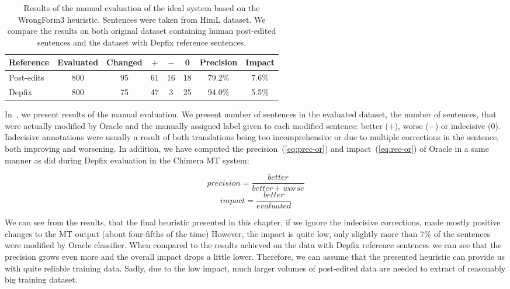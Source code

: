 \begin{table*}[t]
\centering
\small

\begin{tabular}{l|cc|ccc|cc}
Reference  &  Evaluated  &  Changed  &  $+$  &  $-$  &  0  &  Precision  &  Impact  \\
\hline
Post-edits  &  800  &  95  &  61  &  16  &  18  &  79.2\%  &  7.6\%  \\
Depfix  & 800  &  75  &  47  &  3  &  25  &  94.0\%  &  5.5\%  \\
\end{tabular}
\caption[Manual evaluation of the Czech Oracle classifier]{
Results of the manual evaluation of the ideal system based on the WrongForm3 heuristic.
Sentences were taken from HimL dataset. We compare the results on both original dataset
containing human post-edited sentences and
the dataset with Depfix reference sentences.
}
\label{oracle-maneval}
\end{table*}

In~, we present results of the manual evaluation.
We present number of sentences in the evaluated dataset, the number of sentences,
that were actually modified by Oracle and the manually assigned label given to each modified sentence:
better ($+$), worse ($-$) or indecisive (0).
Indecisive annotations were usually a result of both translations being
too incomprehensive or due to multiple corrections in the sentence, both improving and worsening.
In addition, we have computed the precision~(\ref{eq:prec-or}) and
impact~(\ref{eq:rec-or}) of Oracle in a same manner as \citet{bojar-rosa-tamchyna:2013:WMT} did during Depfix evaluation in the Chimera MT system:

\begin{equation} \label{eq:prec-or}
precision = \frac{better}{better + worse}
\end{equation}
\begin{equation} \label{eq:rec-or}
impact = \frac{better}{evaluated}
\end{equation}

We can see from the results, that the final heuristic presented in this chapter,
if we ignore the indecisive corrections,
made mostly positive changes to the MT output (about four-fifths of the time)
However, the impact is quite low, only slightly more than 7\% of the sentences were modified
by Oracle classifier. When compared to the results achieved on the data with Depfix
reference sentences we can see that the precision grows even more
and the overall impact drops a little lower.
Therefore, we can assume that the presented heuristic can provide us with
quite reliable training data. Sadly, due to the low impact, much larger
volumes of post-edited data are needed to extract of reasonably big training dataset.

